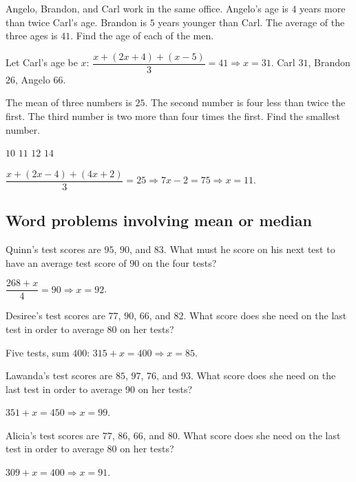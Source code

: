 \question[10]
Angelo, Brandon, and Carl work in the same office. Angelo's age is $4$ years more than twice Carl's age. Brandon is $5$ years younger than Carl. The average of the three ages is $41$. Find the age of each of the men.
\begin{solutionorbox}[2.2in]
  Let Carl's age be $x$: $\dfrac{x+(2x+4)+(x-5)}{3}=41\Rightarrow x=31$. Carl $31$, Brandon $26$, Angelo $66$.
\end{solutionorbox}

\question[5]
The mean of three numbers is $25$. The second number is four less than twice the first. The third number is two more than four times the first. Find the smallest number.
\begin{choices}
  \choice $10$
  \CorrectChoice $11$
  \choice $12$
  \choice $14$
\end{choices}
\begin{solution}
  $\dfrac{x+(2x-4)+(4x+2)}{3}=25\Rightarrow 7x-2=75\Rightarrow x=11$.
\end{solution}

\newpage
\subsection*{Word problems involving mean or median}

\question[5]
Quinn's test scores are $95$, $90$, and $83$. What must he score on his next test to have an average test score of $90$ on the four tests?
\begin{solution}
  $\dfrac{268+x}{4}=90\Rightarrow x=92$.
\end{solution}

\question[5]
Desiree's test scores are $77$, $90$, $66$, and $82$. What score does she need on the last test in order to average $80$ on her tests?
\begin{solution}
  Five tests, sum $400$: $315+x=400\Rightarrow x=85$.
\end{solution}

\question[5]
Lawanda's test scores are $85$, $97$, $76$, and $93$. What score does she need on the last test in order to average $90$ on her tests?
\begin{solution}
  $351+x=450\Rightarrow x=99$.
\end{solution}

\question[5]
Alicia's test scores are $77$, $86$, $66$, and $80$. What score does she need on the last test in order to average $80$ on her tests?
\begin{solution}
  $309+x=400\Rightarrow x=91$.
\end{solution}


